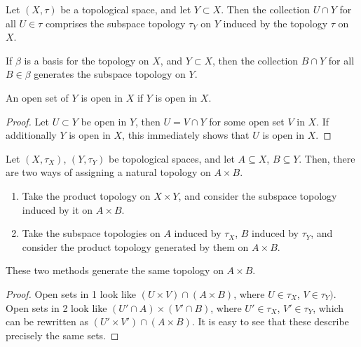 \documentclass[11pt]{article}
\theoremstyle{definition}
\theoremstyle{remark}
\numberwithin{equation}{section}
\begin{document}
    \begin{definition}
        Let $(X, \tau)$ be a topological space, and let $Y \subset X$. Then the
        collection $U \cap Y$ for all $U \in \tau$ comprises the subspace topology
        $\tau_Y$ on $Y$ induced by the topology $\tau$ on $X$.
    \end{definition}

    \begin{lemma}
        If $\beta$ is a basis for the topology on $X$, and $Y \subset X$, then the
        collection $B \cap Y$ for all $B \in \beta$ generates the subspace topology
        on $Y$.
    \end{lemma}

    \begin{lemma}
        An open set of $Y$ is open in $X$ if $Y$ is open in $X$.
    \end{lemma}
    \begin{proof}
        Let $U \subset Y$ be open in $Y$, then $U = V \cap Y$ for some open set $V$
        in $X$. If additionally $Y$ is open in $X$, this immediately shows that $U$
        is open in $X$.
    \end{proof}

    \begin{theorem}
        Let $(X, \tau_X)$, $(Y, \tau_Y)$ be topological spaces, and let $A \subseteq
        X$, $B \subseteq Y$. Then, there are two ways of assigning a natural topology
        on $A \times B$.
        \begin{enumerate}
            \itemsep0em
            \item Take the product topology on $X \times Y$, and consider the
            subspace topology induced by it on $A \times B$.
            \item Take the subspace topologies on $A$ induced by $\tau_X$, $B$
            induced by $\tau_Y$, and consider the product topology generated by them
            on $A \times B$.
        \end{enumerate}
        These two methods generate the same topology on $A \times B$.
    \end{theorem}
    \begin{proof}
        Open sets in 1 look like $(U \times V) \cap (A \times B)$, where $U \in
        \tau_X$, $V \in \tau_Y)$. Open sets in 2 look like $(U' \cap A) \times (V' \cap
        B)$, where $U' \in \tau_X$, $V' \in \tau_Y$, which can be rewritten as $(U'
        \times V') \cap (A \times B)$. It is easy to see that these describe
        precisely the same sets.
    \end{proof}
\end{document}
